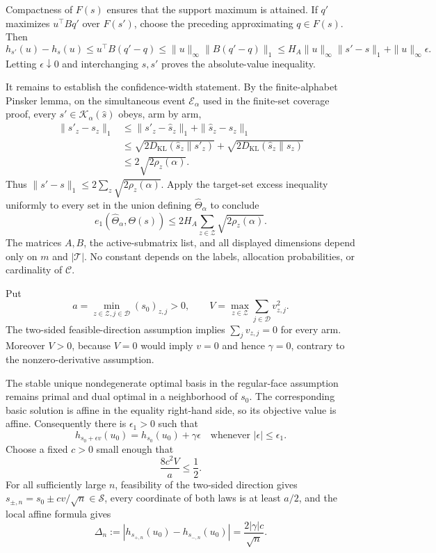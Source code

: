 Compactness of \(F(s)\) ensures that the support maximum is attained.  If \(q'\) maximizes \(u^\top Bq'\) over \(F(s')\), choose the preceding approximating \(q\in F(s)\).  Then
\[
h_{s'}(u)-h_s(u)
\le u^\top B(q'-q)
\le\|u\|_\infty\|B(q'-q)\|_1
\le H_A\|u\|_\infty\|s'-s\|_1+\|u\|_\infty\epsilon.
\]
Letting \(\epsilon\downarrow0\) and interchanging \(s,s'\) proves the absolute-value inequality.

It remains to establish the confidence-width statement.  By the finite-alphabet Pinsker lemma, on the simultaneous event \(\mathcal E_\alpha\) used in the finite-set coverage proof, every \(s'\in\mathcal K_\alpha(\widehat s)\) obeys, arm by arm,
\[
\begin{aligned}
\|s'_z-s_z\|_1
&\le\|s'_z-\widehat s_z\|_1+\|\widehat s_z-s_z\|_1\\
&\le\sqrt{2D_{\mathrm{KL}}(\widehat s_z\|s'_z)}
 +\sqrt{2D_{\mathrm{KL}}(\widehat s_z\|s_z)}\\
&\le2\sqrt{2\rho_z(\alpha)}.
\end{aligned}
\]
Thus \(\|s'-s\|_1\le2\sum_z\sqrt{2\rho_z(\alpha)}\).  Apply the target-set excess inequality uniformly to every set in the union defining \(\widehat\Theta_\alpha\) to conclude
\[
e_1(\widehat\Theta_\alpha,\Theta(s))
\le2H_A\sum_{z\in\mathcal Z}\sqrt{2\rho_z(\alpha)}.
\]
The matrices \(A,B\), the active-submatrix list, and all displayed dimensions depend only on \(m\) and \(|\mathcal T|\).  No constant depends on the labels, allocation probabilities, or cardinality of \(\mathcal C\).

Put
\[
a=\min_{z\in\mathcal Z,j\in\mathcal D}(s_0)_{z,j}>0,
\qquad
V=\max_{z\in\mathcal Z}\sum_{j\in\mathcal D}v_{z,j}^2.
\]
The two-sided feasible-direction assumption implies \(\sum_jv_{z,j}=0\) for every arm.  Moreover \(V>0\), because \(V=0\) would imply \(v=0\) and hence \(\gamma=0\), contrary to the nonzero-derivative assumption.

The stable unique nondegenerate optimal basis in the regular-face assumption remains primal and dual optimal in a neighborhood of \(s_0\).  The corresponding basic solution is affine in the equality right-hand side, so its objective value is affine.  Consequently there is \(\epsilon_1>0\) such that
\[
h_{s_0+\epsilon v}(u_0)=h_{s_0}(u_0)+\gamma\epsilon
\quad\text{whenever }|\epsilon|\le\epsilon_1.
\]
Choose a fixed \(c>0\) small enough that
\[
\frac{8c^2V}{a}\le\frac12.
\]
For all sufficiently large \(n\), feasibility of the two-sided direction gives \(s_{\pm,n}=s_0\pm cv/\sqrt n\in\mathcal S\), every coordinate of both laws is at least \(a/2\), and the local affine formula gives
\[
\Delta_n:=|h_{s_{+,n}}(u_0)-h_{s_{-,n}}(u_0)|
=\frac{2|\gamma|c}{\sqrt n}.
\]

